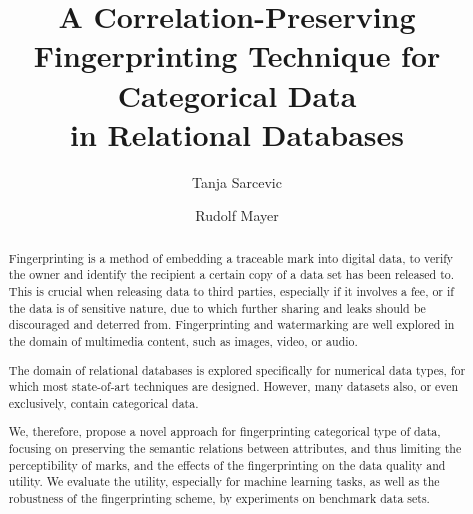 \documentclass[runningheads]{llncs}
\begin{document}
%
\title{A Correlation-Preserving Fingerprinting Technique for Categorical Data\\ in Relational Databases}
%
%
\author{Tanja Sarcevic \and
Rudolf Mayer}
%
%
%
\maketitle              %
%
\begin{abstract}
Fingerprinting is a method of embedding a traceable mark into digital data, to verify the owner and identify the recipient a certain copy of a data set has been released to.
This is crucial when releasing data to third parties, especially if it involves a fee, or if the data is of sensitive nature, due to which further sharing and leaks should be discouraged and deterred from.
Fingerprinting and watermarking are well explored in the domain of multimedia content, such as images, video, or audio.

The domain of relational databases is explored specifically for numerical data types, for which most state-of-art techniques are designed.
However, many datasets also, or even exclusively, contain categorical data.

We, therefore, propose a novel approach for fingerprinting categorical type of data, focusing on preserving the semantic relations between attributes, and thus limiting the perceptibility of marks, and the effects of the fingerprinting on the data quality and utility.
We evaluate the utility, especially for machine learning tasks, as well as the robustness of the fingerprinting scheme, by experiments on benchmark data sets.


\end{abstract}
%
%
%
\end{document}
